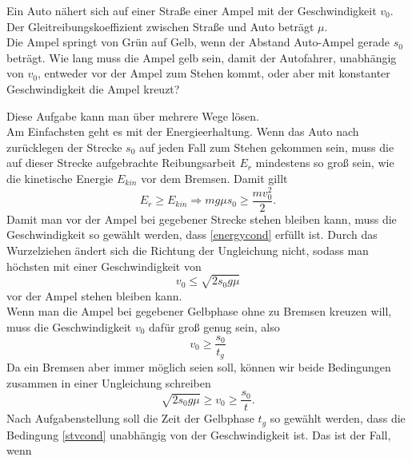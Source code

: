 \begin{Exercise}[label = ampel, title = Gute Ampel, difficulty = 3, origin = Alte IPhO-Aufgabe ]
	Ein Auto nähert sich auf einer Straße einer Ampel mit der Geschwindigkeit $v_0$.  Der Gleitreibungskoeffizient zwischen Straße und Auto beträgt $\mu$.\\ Die Ampel springt von Grün auf Gelb, wenn der Abstand Auto-Ampel gerade $s_0$ beträgt. Wie lang muss die Ampel gelb sein, damit der Autofahrer, unabhängig von $v_0$, entweder vor der Ampel zum Stehen kommt, oder aber mit konstanter Geschwindigkeit die Ampel kreuzt?
\end{Exercise}	
\begin{Answer}[ref = ampel]
	Diese Aufgabe kann man über mehrere Wege lösen.\\
	 Am Einfachsten geht es mit der Energieerhaltung. Wenn das Auto nach zurücklegen der Strecke $s_0$ auf jeden Fall zum Stehen gekommen sein, muss die auf dieser Strecke aufgebrachte Reibungsarbeit $E_r$ mindestens so groß sein, wie die kinetische Energie $E_{kin}$ vor dem Bremsen. Damit gillt
	 \begin{equation}\label{energycond}
	 E_{r} \geq E_{kin} \Rightarrow mg\mu s_0 \geq \frac{mv_0^2}{2}.
	 \end{equation}
	 Damit man vor der Ampel bei gegebener Strecke stehen bleiben kann, muss die Geschwindigkeit so gewählt werden, dass \eqref{energycond} erfüllt ist. Durch das Wurzelziehen ändert sich die Richtung der Ungleichung nicht, sodass man höchsten mit einer Geschwindigkeit von 
	 \begin{equation}\label{vfriccond}
	 	v_0\leq \sqrt{2s_0g\mu}
	 \end{equation}
	 vor der Ampel stehen bleiben kann.\\
	 Wenn man die Ampel bei gegebener Gelbphase ohne zu Bremsen kreuzen will, muss die Geschwindigkeit $v_0$ dafür groß genug sein, also
	 \begin{equation}\label{velcond}
	 	v_0 \geq  \frac{s_0}{t_g}
	 \end{equation}
	Da ein Bremsen aber immer möglich seien soll, können wir beide Bedingungen zusammen in einer Ungleichung schreiben
	\begin{equation}\label{stvcond}
		\sqrt{2s_0g\mu}\geq v_0 \geq \frac{s_0}{t}.
	\end{equation}
	Nach Aufgabenstellung soll die Zeit der Gelbphase $t_g$ so gewählt werden, dass die Bedingung \eqref{stvcond} unabhängig von der Geschwindigkeit ist. Das ist der Fall, wenn
	\begin{equation}\label{energytcond}

\end{equation}
\end{Answer}
